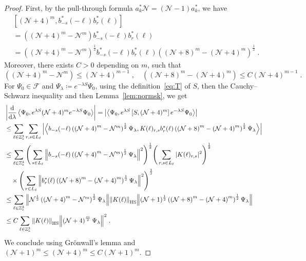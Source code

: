 \documentclass[12pt,a4paper]{article}
\numberwithin{equation}{section}
\newcommand{\cF}{\mathcal{F}}
\newcommand{\cN}{\mathcal{N}}
\newcommand{\1}{\mathbb{I}}
\newcommand{\di}{\textnormal{d}}
\newcommand{\HS}{\mathrm{HS}}
\newcommand{\Ncal}{\mathcal{N}}
\newcommand{\NN}{\mathcal{N}}
\newcommand{\half}{\frac{1}{2}}
\newcommand{\eva}[1]{\left\langle #1 \right\rangle}
\theoremstyle{plain}
\theoremstyle{definition}
\theoremstyle{remark}
\theoremstyle{plain}
\theoremstyle{definition}
\theoremstyle{remark}
\begin{document}
\begin{proof}
First, by the pull-through formula $a^*_k \Ncal = (\Ncal - 1) a^*_k$, we have
\begin{align}
	& \left[(\NN+4)^m, b^*_{-s}(-\ell)b^*_{r}(\ell)\right] \nonumber\\
	&= \left( (\NN+4)^m - \NN^m \right) b^*_{-s}(-\ell)b^*_{r}(\ell) \nonumber\\
	&= \left( \left(\NN+4\right)^m - \NN^m \right)^\half b^*_{-s}(-\ell)b^*_{r}(\ell) \left( \left(\NN+8\right)^m - \left(\NN+4\right)^m \right)^\half \;.
\end{align}
Moreover, there exists $ C > 0 $ depending on $ m $, such that
\begin{equation}
	\left( \left(\NN+4\right)^m - \NN^m \right)
	\leq \left(\NN+4\right)^{m-1} \;, \quad
	\left( \left(\NN+8\right)^m - \left(\NN+4\right)^m \right)
	\leq C \left(\NN+4\right)^{m-1} \;.
\end{equation}
For $ \Psi_0 \in \cF $ and $ \Psi_\lambda \coloneq e^{-\lambda S} \Psi_0 $, using the definition~\eqref{eq:T} of $ S $, then the Cauchy--Schwarz inequality and then Lemma~\ref{lem:normsk}, we get
\begin{align}
	&\left|\frac{\di}{\di\lambda}\eva{\Psi_0, e^{\lambda S} (\mathcal{N}+4)^m e^{-\lambda S} \Psi_0 }\right|
	= \left| \eva{\Psi_0, e^{\lambda S} \left[S, (\NN+4)^m\right] e^{-\lambda S} \Psi_0}\right|\nonumber\\
	&\leq \sum_{\ell\in \mathbb{Z}^3_*}
		\sum_{r,s\in L_\ell} \abs{\eva{ b_{-s}(-\ell) \left( \left(\NN+4\right)^m - \NN^m \right)^\half \Psi_\lambda, K(\ell)_{r,s} b^*_{r}(\ell) \left( \left(\NN+8\right)^m - \left(\NN+4\right)^m \right)^\half \Psi_\lambda }}\nonumber\\
	&\leq \sum_{\ell\in \mathbb{Z}^3_*}
		\Bigg( \sum_{s\in L_\ell} \norm{ b_{-s}(-\ell) \left( \left(\NN+4\right)^m - \NN^m \right)^\half \Psi_\lambda}^2 \Bigg)^{\half}
		\Bigg( \sum_{r,s\in L_\ell} |K(\ell)_{r,s}|^2 \Bigg)^{\half} \nonumber\\
		&\quad \times \Bigg( \sum_{r\in L_\ell} \norm {b^*_{r}(\ell) \left( \left(\NN+8\right)^m - \left(\NN+4\right)^m \right)^\half \Psi_\lambda}^2 \Bigg)^{\half} \nonumber\\
	&\leq \sum_{\ell\in \mathbb{Z}^3_*}
		\norm{ \NN^\half \left( \left(\NN+4\right)^m - \NN^m \right)^\half \Psi_\lambda}
		\norm{K(\ell)}_{\HS}
		\norm{ (\NN+1)^\half \left( \left(\NN+8\right)^m - \left(\NN+4\right)^m \right)^\half \Psi_\lambda } \nonumber\\
	&\leq C \sum_{\ell\in \mathbb{Z}^3_*}
		\norm{K(\ell)}_{\HS}
		\norm{ \left(\NN+4\right)^\frac{m}{2} \Psi_\lambda}^2 \;.
\end{align}
We conclude using Gr\"onwall's lemma and $ (\cN+1)^m \le (\cN+4)^m \le C (\cN+1)^m $.
\end{proof}
\end{document}
